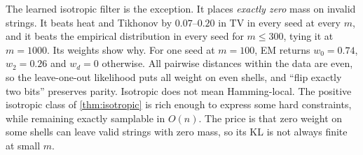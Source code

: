 The learned isotropic filter is the exception. It places \emph{exactly zero} mass on invalid strings. It beats heat and Tikhonov by $0.07$--$0.20$ in TV in every seed at every $m$, and it beats the empirical distribution in every seed for $m\le300$, tying it at $m=1000$. Its weights show why. For one seed at $m=100$, EM returns $w_0=0.74$, $w_2=0.26$ and $w_d=0$ otherwise. All pairwise distances within the data are even, so the leave-one-out likelihood puts all weight on even shells, and ``flip exactly two bits'' preserves parity. Isotropic does not mean Hamming-local. The positive isotropic class of \cref{thm:isotropic} is rich enough to express some hard constraints, while remaining exactly samplable in $O(n)$. The price is that zero weight on some shells can leave valid strings with zero mass, so its KL is not always finite at small $m$.
